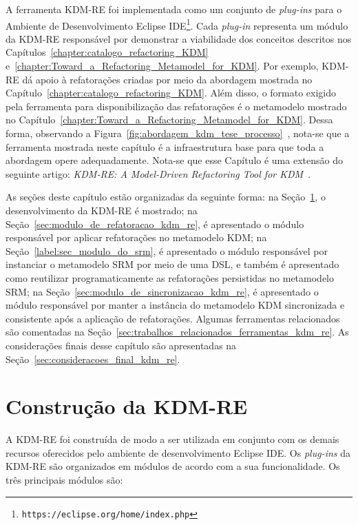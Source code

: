 A ferramenta KDM-RE foi implementada como um conjunto de \textit{plug-ins} para o Ambiente de Desenvolvimento Eclipse IDE\footnote{\texttt{https://eclipse.org/home/index.php}}. Cada \textit{plug-in} representa um módulo da KDM-RE responsável por demonstrar a viabilidade dos conceitos descritos nos Capítulos~\ref{chapter:catalogo_refactoring_KDM} e~\ref{chapter:Toward_a_Refactoring_Metamodel_for_KDM}. Por exemplo, KDM-RE dá apoio à refatorações criadas por meio da abordagem mostrada no Capítulo~\ref{chapter:catalogo_refactoring_KDM}. Além disso, o formato exigido pela ferramenta para disponibilização das refatorações é o metamodelo mostrado no Capítulo~\ref{chapter:Toward_a_Refactoring_Metamodel_for_KDM}. Dessa forma, observando a Figura~\ref{fig:abordagem_kdm_tese_processo}~, nota-se que a ferramenta mostrada neste capítulo é a infraestrutura base para que toda a abordagem opere adequadamente. Nota-se que esse Capítulo é uma extensão do seguinte artigo: \textit{KDM-RE: A Model-Driven Refactoring Tool for KDM}~\cite{durelli_VEM_ferramenta}.


As seções deste capítulo estão organizadas da seguinte forma: na Seção~\ref{sec:construcao_da_kdm_re}, o desenvolvimento da KDM-RE é mostrado; na Seção~\ref{sec:modulo_de_refatoracao_kdm_re}, é apresentado o módulo responsável por aplicar refatorações no metamodelo KDM; na Seção~\ref{label:sec_modulo_do_srm}, é apresentado o módulo responsável por instanciar o metamodelo SRM por meio de uma DSL, e também é apresentado como reutilizar programaticamente as refatorações persistidas no metamodelo SRM; na Seção~\ref{sec:modulo_de_sincronizacao_kdm_re}, é apresentado o módulo responsável por manter a instância do metamodelo KDM sincronizada e consistente após a aplicação de refatorações. Algumas ferramentas relacionados são comentadas na Seção~\ref{sec:trabalhos_relacionados_ferramentas_kdm_re}. As considerações finais desse capítulo são apresentadas na Seção~\ref{sec:consideracoes_final_kdm_re}.

\section{Construção da KDM-RE}\label{sec:construcao_da_kdm_re}

A KDM-RE foi construída de modo a ser utilizada em conjunto com os demais recursos oferecidos pelo ambiente de desenvolvimento Eclipse IDE. Os \textit{plug-ins} da KDM-RE são organizados em módulos de acordo com a sua funcionalidade. Os três principais módulos são:

